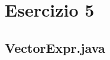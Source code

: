 \section*{Esercizio 5}

\subsection*{VectorExpr.java}
\inputminted{java}{tex/src/5/VectorExpr.java}
